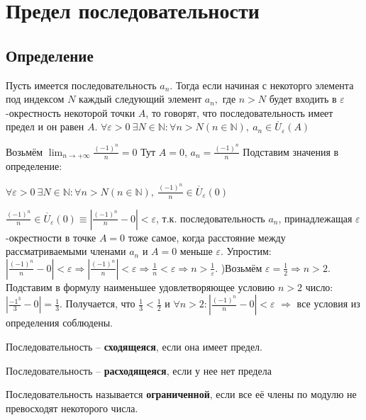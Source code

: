 \chapter{Предел последовательности}
\section{Определение}
Пусть имеется последовательность $a_n$. Тогда если начиная с некоторго элемента под индексом $N$ каждый следующий элемент $a_n,$ где $n>N$ будет входить в $\varepsilon$-окрестность некоторой точки $A$, то говорят, что последовательность имеет предел и он равен $A$. \newline
$\forall \varepsilon > 0\ \exists N \in \mathbb{N} : \forall n > N(n \in \mathbb{N}),\ a_n \in \mathring{U_\varepsilon}(A)$
\begin{example}
Возьмём $\displaystyle \lim_{n \to +\infty}\frac{(-1)^n}{n} = 0$
\newline
Тут $A = 0$, $a_n = \frac{(-1)^n}{n}$
\newline
Подставим значения в определение:
\begin{center}$\forall\varepsilon > 0\ \exists N \in \mathbb{N} : \forall n > N(n \in \mathbb{N}),\ \frac{(-1)^n}{n} \in \mathring{U_\varepsilon}(0)$\end{center}
$\frac{(-1)^n}{n} \in \mathring{U_\varepsilon}(0) \equiv |\frac{(-1)^n}{n} - 0| < \varepsilon$, т.к. последовательность $a_n$, принадлежащая $\varepsilon$-окрестности в точке $A = 0$ тоже самое, когда расстояние между рассматриваемыми членами $a_n$ и $A = 0$ меньше $\varepsilon$.\newline
Упростим: $|\frac{(-1)^n}{n} - 0| < \varepsilon \Rightarrow |\frac{(-1)^n}{n}| < \varepsilon \Rightarrow \frac{1}{n} < \varepsilon \Rightarrow n > \frac{1}{\varepsilon} $. )Возьмём $\varepsilon = \frac{1}{2} \Rightarrow n > 2$. Подставим в формулу наименьшее удовлетворяющее условию $n > 2$ число: $|\frac{-1^3}{3} - 0| = \frac{1}{3}$. Получается, что $\frac{1}{3} < \frac{1}{2}$ и $\forall n > 2: |\frac{(-1)^n}{n} - 0| < \varepsilon$ $\Rightarrow$ все условия из определения соблюдены. \newline
\end{example}

\begin{mydef}Последовательность -- \textbf{сходящеяся}, если она имеет предел.\end{mydef}
\begin{mydef}Последовательность -- \textbf{расходящеяся}, если у нее нет предела\end{mydef}
\begin{mydef}Последовательность называется \textbf{ограниченной}, если все её члены по модулю не превосходят некоторого числа.\end{mydef}

